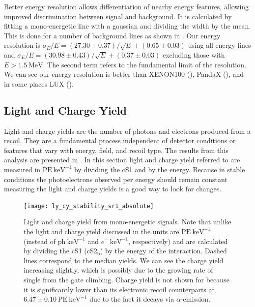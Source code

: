Better energy resolution
allows differentiation of nearby energy features, allowing improved discrimination between signal and background.  It is calculated
by fitting a mono-energetic \gammaray line with a gaussian and dividing the width by the mean.  This is done for a number of background
lines as shown in .  Our energy resolution
is $\sigma_E / E = (27.30 \pm 0.37) / \sqrt{E} + (0.65 \pm 0.03)$ using all energy lines and
$\sigma_E / E = (30.98 \pm 0.43) / \sqrt{E} + (0.37 \pm 0.03)$ excluding those with $E > 1.5\ \mathrm{MeV}$.  The second term refers to
the fundamental limit of the resolution.  We can see our energy resolution is better than XENON100 (), PandaX
(), and in some places LUX ().



\subsection{Light and Charge Yield}
\label{subsec:det_char_ly_cy}
Light and charge yields are the number of photons and electrons produced from a recoil.  They are a fundamental process independent of
detector conditions or features that vary with energy, field, and recoil type.  The results from this analysis are presented in
.  In this section light and charge yield referred to are measured in
$\mathrm{PE\ keV^{-1}}$ by dividing the cS1 and \cstwob by the energy.  Because in stable conditions the photoelectrons
observed per energy should remain constant measuring the light and charge yields is a good way to look for changes.

\begin{figure}
\centering
\texttt{[image: ly\_cy\_stability\_sr1\_absolute]}
\caption{Light and charge yield from mono-energetic signals.  Note that unlike the light and charge yield discussed in
 the units are $\mathrm{PE\ keV^{-1}}$ (instead of $\mathrm{ph\ keV^{-1}}$ and
$e^-\ \mathrm{keV^{-1}}$, respectively) and are calculated by dividing the cS1 (cS2$_{\mathrm{b}}$) by the energy of the
interaction.  Dashed lines correspond to the median yields.  We can see the charge yield increasing slightly, which is possibly due to
the growing rate of single \electron from the gate climbing.  Charge yield is not shown for  because it is significantly
lower than its
electronic recoil counterparts at $6.47 \pm 0.10\ \mathrm{PE\ keV^{-1}}$ due to the fact it decays via $\alpha$-emission.}
\label{fig:det_char_ly_cy_ly_cy}
\end{figure}

